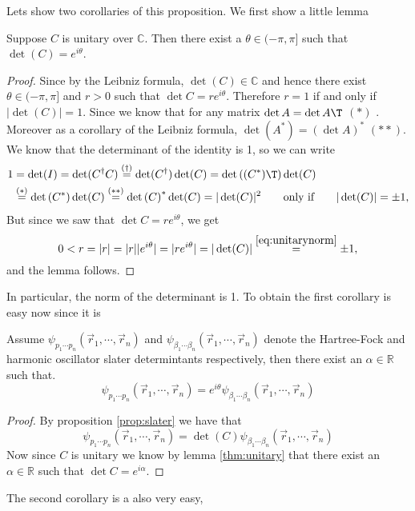 \documentclass[11pt,english,a4paper]{article}
\begin{document}
Lets show two corollaries of this proposition. We first show a little lemma
\begin{lemma}
Suppose $C$ is unitary over $\mathbb{C}$. Then there exist a $\theta \in (-\pi,\pi]$ such that $\det(C) = e^{ i \theta}$. \label{thm:unitary}
\end{lemma}
\begin{proof}
Since by the Leibniz formula, $\det (C) \in \mathbb{C}$ and hence there exist $\theta \in (-\pi,\pi]$ and $r>0$ such that $\det C = r e^{ i \theta}$. Therefore $r = 1$ if and only if $|\det(C)| = 1$. Since we know that for any matrix $ \det A = \det A\T $ $(*)$ \parencite[172]{lay_linear_2012}. Moreover as a corollary of the Leibniz formula, $\det (A^*) = (\det A)^*$ $(**)$. We know that the determinant of the identity is 1, so we can write
\begin{align}
1 &= \det(I) = \det(C^\dagger C) \stackrel{(\dagger)}{=} \det(C^\dagger)\det( C) = \det\left( (C^*)\T \right) \det (C) \nonumber \\
&\stackrel{(*)}{=} \det\left( C^* \right) \det (C) \stackrel{(**)}{=}\det\left( C \right)^* \det (C) = |\det (C)|^2 \qquad \text{only if} \qquad  |\det(C)| = \pm 1, \label{eq:unitarynorm}
\end{align}
But since we saw that $\det C = r e^{ i \theta}$, we get
\[
0<r = |r| = |r| |e^{ i \theta}| = |r e^{ i \theta}| = |\det (C)| \stackrel{\eqref{eq:unitarynorm} }{=} \pm 1,
\]
and the lemma follows.
\end{proof}
In particular, the norm of the determinant is 1. To obtain the first corollary is easy now since it is
\begin{corollary}
Assume $\psi_{  p_1\cdots p_n}(\vec{r}_1,\cdots, \vec{r}_n)$ and $\psi_{  \beta_1\cdots \beta_n}(\vec{r}_1,\cdots, \vec{r}_n)$ denote the Hartree-Fock and harmonic oscillator slater determintants respectively, then there exist an $\alpha \in \mathbb{R}$ such that.
\[
\psi_{  p_1\cdots p_n}(\vec{r}_1,\cdots, \vec{r}_n) = e^{ i \theta}\psi_{  \beta_1\cdots \beta_n}(\vec{r}_1,\cdots, \vec{r}_n) 
\]
\end{corollary}
\begin{proof}
By proposition \ref{prop:slater} we have that
\[
\psi_{  p_1\cdots p_n}(\vec{r}_1,\cdots, \vec{r}_n) = \det (C) \psi_{  \beta_1\cdots \beta_n}(\vec{r}_1,\cdots, \vec{r}_n) 
\]
Now since $C$ is unitary we know by lemma \ref{thm:unitary} that there exist an $\alpha \in \mathbb{R}$ such that $\det C = e^{ i \alpha}$.
\end{proof}
The second corollary is a also very easy,
\end{document}
